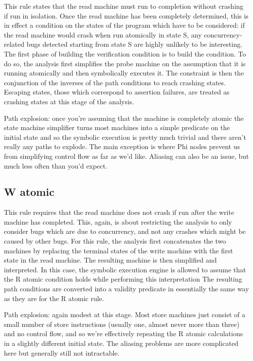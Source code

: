 \documentclass[12pt,a4paper]{book}
\begin{document}
This rule states that the read machine must run to completion without crashing if run in isolation.
Once the read machine has been completely determined, this is in effect a condition on the states of the program which have to be considered: if the read machine would crash when run atomically in state S, any concurrency-related bugs detected starting from state S are highly unlikely to be interesting.
The first phase of building the verification condition is to build the condition.
To do so, the analysis first simplifies the probe machine on the assumption that it is running atomically and then symbolically executes it.
The constraint is then the conjunction of the inverses of the path conditions to reach crashing states.
Escaping states, those which correspond to assertion failures, are treated as crashing states at this stage of the analysis.

Path explosion: once you're assuming that the machine is completely atomic the state machine simplifier turns most machines into a simple predicate on the initial state and so the symbolic execution is pretty much trivial and there aren't really any paths to explode.
The main exception is where Phi nodes prevent us from simplifying control flow as far as we'd like.
Aliasing can also be an issue, but much less often than you'd expect.

\subsection{W atomic}

This rule requires that the read machine does not crash if run after the write machine has completed.
This, again, is about restricting the analysis to only consider bugs which are due to concurrency, and not any crashes which might be caused by other bugs.
For this rule, the analysis first concatenates the two machines by replacing the terminal states of the write machine with the first state in the read machine.
The resulting machine is then simplified and interpreted.
In this case, the symbolic execution engine is allowed to assume that the R atomic condition holds while performing this interpretation
The resulting path conditions are converted into a validity predicate in essentially the same way as they are for the R atomic rule.

Path explosion: again modest at this stage.
Most store machines just consist of a small number of store instructions (usually one, almost never more than three) and no control flow, and so we're effectively repeating the R atomic calculations in a slightly different initial state.
The aliasing problems are more complicated here but generally still not intractable.
\end{document}
